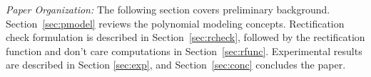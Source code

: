 


{\it Paper Organization:} The following section covers preliminary
background. Section~\ref{sec:pmodel} reviews the polynomial modeling
concepts. Rectification check formulation is described in
Section~\ref{sec:rcheck}, followed by the rectification function and
don't care computations  in Section~\ref{sec:rfunc}. Experimental
results are described in Section \ref{sec:exp}, and
Section~\ref{sec:conc} concludes the paper. 